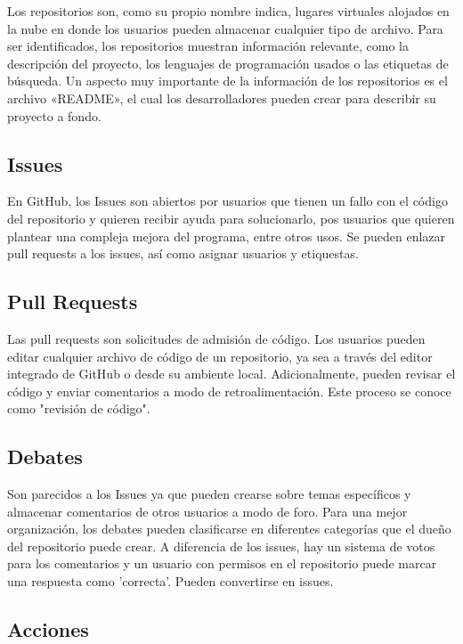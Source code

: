 \documentclass[a4paper, 12pt]{book}
\begin{document}
Los repositorios son, como su propio nombre indica, lugares virtuales alojados en la nube en donde los usuarios pueden almacenar cualquier tipo de archivo. Para ser identificados, los repositorios muestran información relevante, como la descripción del proyecto, los lenguajes de programación usados o las etiquetas de búsqueda. Un aspecto muy importante de la información de los repositorios es el archivo «README», el cual los desarrolladores pueden crear para describir su proyecto a fondo.

\subsection{Issues}

En GitHub, los Issues son abiertos por usuarios que tienen un fallo con el código del repositorio y quieren recibir ayuda para solucionarlo, pos usuarios que quieren plantear una compleja mejora del programa, entre otros usos. Se pueden enlazar pull requests a los issues, así como asignar usuarios y etiquestas.

\subsection{Pull Requests}

Las pull requests son solicitudes de admisión de código. Los usuarios pueden editar cualquier archivo de código de un repositorio, ya sea a través del editor integrado de GitHub o desde su ambiente local. Adicionalmente, pueden revisar el código y enviar comentarios a modo de retroalimentación. Este proceso se conoce como "revisión de código".

\subsection{Debates}
Son parecidos a los Issues ya que pueden crearse sobre temas específicos y almacenar comentarios de otros usuarios a modo de foro. Para una mejor organización, los debates pueden clasificarse en diferentes categorías que el dueño del repositorio puede crear. A diferencia de los issues, hay un sistema de votos para los comentarios y un usuario con permisos en el repositorio puede marcar una respuesta como 'correcta'. Pueden convertirse en issues.

\subsection{Acciones}
\end{document}

